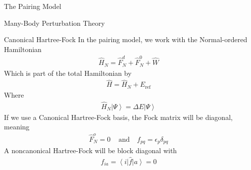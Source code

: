 \documentclass[twoside,english]{uiofysmaster}
\begin{document}
\begin{chapter}{The Pairing Model}
\begin{section}{Many-Body Perturbation Theory}
 	\begin{subsection}{Canonical Hartree-Fock}
 		In the pairing model, we work with the Normal-ordered Hamiltonian
 		\begin{align}
 			\hat H_N = \hat F_N^d + \hat F_N^0 + \hat W		
 		\end{align}
 		Which is part of the total Hamiltonian by
 		\begin{align}
 			\hat H = \hat H_N + E_{\text{ref}}
 		\end{align}
 		Where
 		\begin{align}
 			\hat H_N \left| \Psi \right> = \Delta E \left| \Psi \right> 
 		\end{align}
 		If we use a Canonical Hartree-Fock basis, the Fock matrix will be diagonal, meaning 
 		\begin{align}
 			\hat F_N^o = 0 \;\;\; \text{     and  } \:\;\: f_{pq} = \epsilon_p \delta_{pq}
 		\end{align}
 		A noncanonical Hartree-Fock will be block diagonal with 
 		\begin{align}
 			f_{ia} = \left< i \right| \hat f \left| a \right> = 0
 		\end{align}

 	\end{subsection}


\end{section}
\end{chapter}
\end{document}
